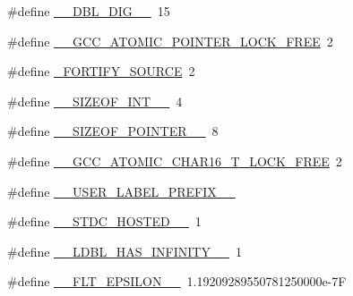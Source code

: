 \begin{DoxyCompactItemize}
\#define \hyperlink{build-analizer__host-_desktop___qt__5__9__0___g_c_c__64bit-_release_2moc__predefs_8h_a61969667ef3b668024a20df9bc34c991}{\+\_\+\+\_\+\+D\+B\+L\+\_\+\+D\+I\+G\+\_\+\+\_\+}~15
\item 
\#define \hyperlink{build-analizer__host-_desktop___qt__5__9__0___g_c_c__64bit-_release_2moc__predefs_8h_aa808bc3159395526ac0c07d36b87dec1}{\+\_\+\+\_\+\+G\+C\+C\+\_\+\+A\+T\+O\+M\+I\+C\+\_\+\+P\+O\+I\+N\+T\+E\+R\+\_\+\+L\+O\+C\+K\+\_\+\+F\+R\+E\+E}~2
\item 
\#define \hyperlink{build-analizer__host-_desktop___qt__5__9__0___g_c_c__64bit-_release_2moc__predefs_8h_ac95d263a48eda25c373846eb54144fc4}{\+\_\+\+F\+O\+R\+T\+I\+F\+Y\+\_\+\+S\+O\+U\+R\+C\+E}~2
\item 
\#define \hyperlink{build-analizer__host-_desktop___qt__5__9__0___g_c_c__64bit-_release_2moc__predefs_8h_a4b2be09502f3fe1cd13838c6761803b3}{\+\_\+\+\_\+\+S\+I\+Z\+E\+O\+F\+\_\+\+I\+N\+T\+\_\+\+\_\+}~4
\item 
\#define \hyperlink{build-analizer__host-_desktop___qt__5__9__0___g_c_c__64bit-_release_2moc__predefs_8h_a8bd657ce95940b7c6087cf5aa54d5280}{\+\_\+\+\_\+\+S\+I\+Z\+E\+O\+F\+\_\+\+P\+O\+I\+N\+T\+E\+R\+\_\+\+\_\+}~8
\item 
\#define \hyperlink{build-analizer__host-_desktop___qt__5__9__0___g_c_c__64bit-_release_2moc__predefs_8h_a7f18358ae5a65523140cb561bbeaa3a9}{\+\_\+\+\_\+\+G\+C\+C\+\_\+\+A\+T\+O\+M\+I\+C\+\_\+\+C\+H\+A\+R16\+\_\+\+T\+\_\+\+L\+O\+C\+K\+\_\+\+F\+R\+E\+E}~2
\item 
\#define \hyperlink{build-analizer__host-_desktop___qt__5__9__0___g_c_c__64bit-_release_2moc__predefs_8h_aff6bf0ff0fa3b5cbd23a8ae1131c87a9}{\+\_\+\+\_\+\+U\+S\+E\+R\+\_\+\+L\+A\+B\+E\+L\+\_\+\+P\+R\+E\+F\+I\+X\+\_\+\+\_\+}
\item 
\#define \hyperlink{build-analizer__host-_desktop___qt__5__9__0___g_c_c__64bit-_release_2moc__predefs_8h_a309fa84aefd09132258bbe21c20ef7d4}{\+\_\+\+\_\+\+S\+T\+D\+C\+\_\+\+H\+O\+S\+T\+E\+D\+\_\+\+\_\+}~1
\item 
\#define \hyperlink{build-analizer__host-_desktop___qt__5__9__0___g_c_c__64bit-_release_2moc__predefs_8h_a87140cc80075e8907e7bbfd910c5642a}{\+\_\+\+\_\+\+L\+D\+B\+L\+\_\+\+H\+A\+S\+\_\+\+I\+N\+F\+I\+N\+I\+T\+Y\+\_\+\+\_\+}~1
\item 
\#define \hyperlink{build-analizer__host-_desktop___qt__5__9__0___g_c_c__64bit-_release_2moc__predefs_8h_a7ac5a3b1dc00b508a391f8c6c37e2165}{\+\_\+\+\_\+\+F\+L\+T\+\_\+\+E\+P\+S\+I\+L\+O\+N\+\_\+\+\_\+}~1.\+19209289550781250000e-\/7\+F

\end{DoxyCompactItemize}
